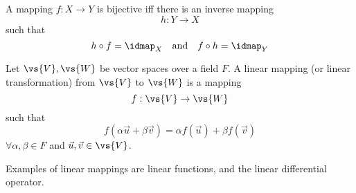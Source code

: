 \begin{lemma}
  A mapping $f:X \to Y$ is bijective iff there is an inverse
  mapping \[ h: Y \to X \] such that \[ h \circ f = \idmap_X \quad
  \text{and} \quad f \circ h = \idmap_Y \]
\end{lemma}

\begin{definition}
  Let $\vs{V}, \vs{W}$ be vector spaces over a field $F$.
A linear mapping (or linear transformation) from $\vs{V}$ to $\vs{W}$ is a mapping \[ f: \vs{V} \to \vs{W} \] such that 
\[ f(\alpha \vec{u} + \beta \vec{v}) = \alpha f(\vec{u}) + \beta f(\vec{v}) \] $\forall \alpha, \beta \in F$ and $\vec{u}, \vec{v} \in \vs{V}$.
\end{definition}
Examples of linear mappings are linear functions, and the linear differential operator.

